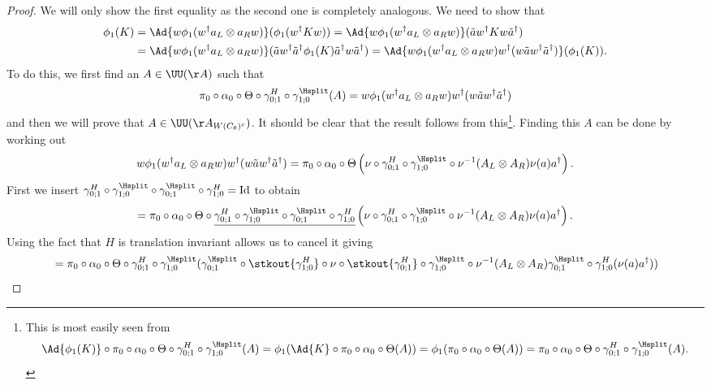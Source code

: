 \begin{proof}
	We will only show the first equality as the second one is completely analogous. We need to show that
	\begin{align}
		\phi_1(K)&=\Ad{w\phi_1(w^\dagger a_L\otimes a_R w)}(\phi_1(w^\dagger K w))=\Ad{w\phi_1(w^\dagger a_L\otimes a_R w)}(\tilde{a}w^\dagger K w\tilde{a}^\dagger)\\
		\nonumber
		&=\Ad{w\phi_1(w^\dagger a_L\otimes a_R w)}(\tilde{a}w^\dagger \tilde{a}^\dagger \phi_1(K) \tilde{a}^\dagger w\tilde{a}^\dagger)=\Ad{w\phi_1(w^\dagger a_L\otimes a_R w)w^\dagger (w \tilde{a}w^\dagger \tilde{a}^\dagger)}(\phi_1(K)).
	\end{align}
	To do this, we first find an $A\in\UU(\AA)$ such that
	\begin{equation}
		\pi_0\circ\alpha_0\circ\Theta\circ\gamma^H_{0;1}\circ\gamma^{\Hsplit}_{1;0}(A)=w\phi_1(w^\dagger a_L\otimes a_R w)w^\dagger (w \tilde{a}w^\dagger \tilde{a}^\dagger)
	\end{equation}
	and then we will prove that $A\in\UU(\AA_{W(C_\theta)^c})$. It should be clear that the result follows from this\footnote{This is most easily seen from\begin{equation}\Ad{\phi_1(K)}\circ\pi_0\circ\alpha_0\circ\Theta\circ\gamma^H_{0;1}\circ\gamma^{\Hsplit}_{1;0}(A)=\phi_1(\Ad{K}\circ\pi_0\circ\alpha_0\circ\Theta(A))=\phi_1(\pi_0\circ\alpha_0\circ\Theta(A))=\pi_0\circ\alpha_0\circ\Theta\circ\gamma^H_{0;1}\circ\gamma^{\Hsplit}_{1;0}(A). \end{equation}}. Finding this $A$ can be done by working out
	\begin{equation}
		w\phi_1(w^\dagger a_L\otimes a_R w)w^\dagger (w \tilde{a}w^\dagger \tilde{a}^\dagger)=\pi_0\circ\alpha_0\circ\Theta\left(\nu\circ\gamma^H_{0;1}\circ\gamma^{\Hsplit}_{1;0}\circ\nu^{-1}(A_L\otimes A_R)\nu(a)a^\dagger\right).
	\end{equation}
	First we insert $\gamma^H_{0;1}\circ\gamma^{\Hsplit}_{1;0}\circ\gamma^{\Hsplit}_{0;1}\circ\gamma^H_{1;0}=\text{Id}$ to obtain
	\begin{equation}
		=\pi_0\circ\alpha_0\circ\Theta\circ\underline{\gamma^H_{0;1}\circ\gamma^{\Hsplit}_{1;0}\circ\gamma^{\Hsplit}_{0;1}\circ\gamma^H_{1;0}}\left(\nu\circ\gamma^H_{0;1}\circ\gamma^{\Hsplit}_{1;0}\circ\nu^{-1}(A_L\otimes A_R)\nu(a)a^\dagger\right).
	\end{equation}
	Using the fact that $H$ is translation invariant allows us to cancel it giving
	\begin{align}
		&=\pi_0\circ\alpha_0\circ\Theta\circ\gamma^H_{0;1}\circ\gamma^{\Hsplit}_{1;0}(\gamma^{\Hsplit}_{0;1}\circ\stkout{\gamma^H_{1;0}}\circ\nu\circ\stkout{\gamma^H_{0;1}}\circ\gamma^{\Hsplit}_{1;0}\circ\nu^{-1}(A_L\otimes A_R)\gamma^{\Hsplit}_{0;1}\circ\gamma^H_{1;0}(\nu(a)a^\dagger))\\

\end{align}
\end{proof}
